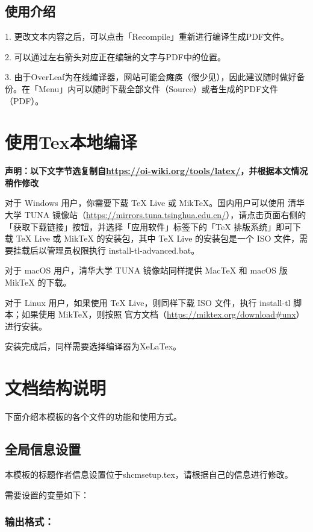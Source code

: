 \subsection{使用介绍}

1. 更改文本内容之后，可以点击「Recompile」重新进行编译生成PDF文件。

2. 可以通过左右箭头对应正在编辑的文字与PDF中的位置。

3. 由于OverLeaf为在线编译器，网站可能会瘫痪（很少见），因此建议随时做好备份。在「Menu」内可以随时下载全部文件（Source）或者生成的PDF文件（PDF）。

\section{使用Tex本地编译}

\textbf{声明：以下文字节选复制自\url{https://oi-wiki.org/tools/latex/}，并根据本文情况稍作修改}

对于 Windows 用户，你需要下载 TeX Live 或 MikTeX。国内用户可以使用 清华大学 TUNA 镜像站（\url{https://mirrors.tuna.tsinghua.edu.cn/}），请点击页面右侧的「获取下载链接」按钮，并选择「应用软件」标签下的「TeX 排版系统」即可下载 TeX Live 或 MikTeX 的安装包，其中 TeX Live 的安装包是一个 ISO 文件，需要挂载后以管理员权限执行 install-tl-advanced.bat。

对于 macOS 用户，清华大学 TUNA 镜像站同样提供 MacTeX 和 macOS 版 MikTeX 的下载。

对于 Linux 用户，如果使用 TeX Live，则同样下载 ISO 文件，执行 install-tl 脚本；如果使用 MikTeX，则按照 官方文档（\url{https://miktex.org/download\#unx}） 进行安装。

安装完成后，同样需要选择编译器为XeLaTex。

\section{文档结构说明}

下面介绍本模板的各个文件的功能和使用方式。

\subsection{全局信息设置}

本模板的标题作者信息设置位于shcmsetup.tex，请根据自己的信息进行修改。

需要设置的变量如下：

\subsubsection{输出格式：}

